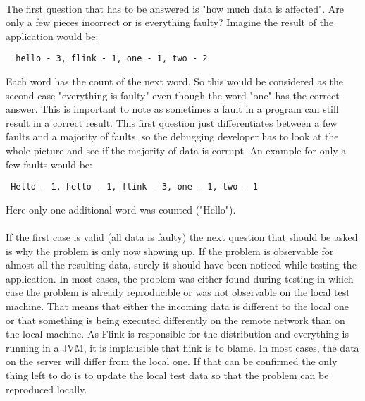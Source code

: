 \paragraph{} The first question that has to be answered is
"how much data is affected". Are only a few pieces incorrect or is everything faulty? Imagine the result of the application would be:
\begin{lstlisting}
  hello - 3, flink - 1, one - 1, two - 2
\end{lstlisting}
  Each word has the count of the next word. So this would be considered as the second case "everything is faulty" even though the word "one" has the correct answer. This is important to note as sometimes a fault in a program can still result in a correct result. This first question just differentiates between a few faults and a majority of faults, so the debugging developer has to look at the whole picture and see if the majority of data is corrupt. An example for only a few faults would be:
\begin{lstlisting}
 Hello - 1, hello - 1, flink - 3, one - 1, two - 1
\end{lstlisting}
Here only one additional word was counted ("Hello").
\paragraph{} If the first case is valid (all data is faulty) the next question that should be asked is why the problem is only now showing up. If the problem is observable for almost all the resulting data, surely it should have been noticed while testing the application. In most cases, the problem was either found during testing in which case the problem is already reproducible or was not observable on the local test machine. That means that either the incoming data is different to the local one or that something is being executed differently on the remote network than on the local machine. As Flink is responsible for the distribution and everything is running in a JVM, it is implausible that flink is to blame. In most cases, the data on the server will differ from the local one. If that can be confirmed the only thing left to do is to update the local test data so that the problem can be reproduced locally.

